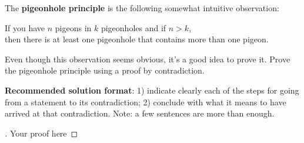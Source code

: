 \documentclass[12pt]{article}
\newenvironment{exercise}[2][Exercise]{\begin{trivlist}
\item[\hskip \labelsep {\bfseries #1}\hskip \labelsep {\bfseries #2.}]}{\end{trivlist}}
\newenvironment{solution}[1][{\color{red} Solution:}]{\begin{trivlist}
\item[\hskip \labelsep {\bfseries #1}\hskip \labelsep {\bfseries}]}{\end{trivlist}}
\begin{document}
\clearpage

\begin{exercise}{3}

    The \textbf{pigeonhole principle} is the following somewhat intuitive observation: 
    \begin{center}
    If you have $n$ pigeons in $k$ pigeonholes and if $n>k$,\\then there is at least one pigeonhole that contains more than one pigeon.
    \end{center}
    Even though this observation seems obvious, it's a good idea to prove it. Prove the pigeonhole principle using a proof by contradiction.

    \textbf{Recommended solution format}: 1) indicate clearly each of the steps for going from a statement to its contradiction; 2) conclude with what it means to have arrived at that contradiction. Note: a few sentences are more than enough.
        
\end{exercise}

\begin{solution} 
        \begin{proof}[\unskip\nopunct]
            Your proof here
        \end{proof}
    \end{solution}

\clearpage

\end{document}
